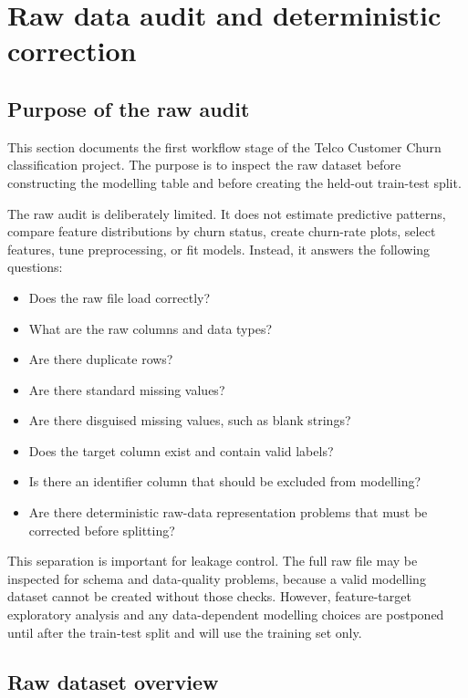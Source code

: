 \section{Raw data audit and deterministic correction}

\subsection{Purpose of the raw audit}

This section documents the first workflow stage of the Telco Customer Churn classification project. The purpose is to inspect the raw dataset before constructing the modelling table and before creating the held-out train-test split.

The raw audit is deliberately limited. It does not estimate predictive patterns, compare feature distributions by churn status, create churn-rate plots, select features, tune preprocessing, or fit models. Instead, it answers the following questions:

\begin{itemize}[leftmargin=*]
    \item Does the raw file load correctly?
    \item What are the raw columns and data types?
    \item Are there duplicate rows?
    \item Are there standard missing values?
    \item Are there disguised missing values, such as blank strings?
    \item Does the target column exist and contain valid labels?
    \item Is there an identifier column that should be excluded from modelling?
    \item Are there deterministic raw-data representation problems that must be corrected before splitting?
\end{itemize}

This separation is important for leakage control. The full raw file may be inspected for schema and data-quality problems, because a valid modelling dataset cannot be created without those checks. However, feature-target exploratory analysis and any data-dependent modelling choices are postponed until after the train-test split and will use the training set only.

\subsection{Raw dataset overview}

